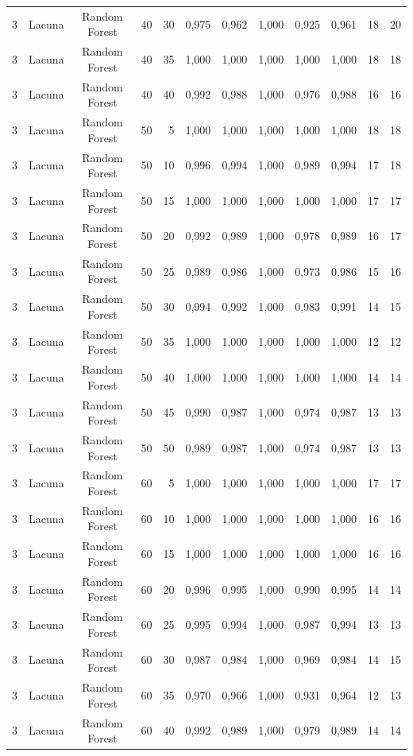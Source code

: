 \begin{longtable}{ccclrrrrrrrr}
3 & Lacuna & Random Forest & 40 & 30 & 0,975 & 0,962 & 1,000 & 0,925 & 0,961 & 18 & 20 \\
3 & Lacuna & Random Forest & 40 & 35 & 1,000 & 1,000 & 1,000 & 1,000 & 1,000 & 18 & 18 \\
3 & Lacuna & Random Forest & 40 & 40 & 0,992 & 0,988 & 1,000 & 0,976 & 0,988 & 16 & 16 \\
3 & Lacuna & Random Forest & 50 & 5 & 1,000 & 1,000 & 1,000 & 1,000 & 1,000 & 18 & 18 \\
3 & Lacuna & Random Forest & 50 & 10 & 0,996 & 0,994 & 1,000 & 0,989 & 0,994 & 17 & 18 \\
3 & Lacuna & Random Forest & 50 & 15 & 1,000 & 1,000 & 1,000 & 1,000 & 1,000 & 17 & 17 \\
3 & Lacuna & Random Forest & 50 & 20 & 0,992 & 0,989 & 1,000 & 0,978 & 0,989 & 16 & 17 \\
3 & Lacuna & Random Forest & 50 & 25 & 0,989 & 0,986 & 1,000 & 0,973 & 0,986 & 15 & 16 \\
3 & Lacuna & Random Forest & 50 & 30 & 0,994 & 0,992 & 1,000 & 0,983 & 0,991 & 14 & 15 \\
3 & Lacuna & Random Forest & 50 & 35 & 1,000 & 1,000 & 1,000 & 1,000 & 1,000 & 12 & 12 \\
3 & Lacuna & Random Forest & 50 & 40 & 1,000 & 1,000 & 1,000 & 1,000 & 1,000 & 14 & 14 \\
3 & Lacuna & Random Forest & 50 & 45 & 0,990 & 0,987 & 1,000 & 0,974 & 0,987 & 13 & 13 \\
3 & Lacuna & Random Forest & 50 & 50 & 0,989 & 0,987 & 1,000 & 0,974 & 0,987 & 13 & 13 \\
3 & Lacuna & Random Forest & 60 & 5 & 1,000 & 1,000 & 1,000 & 1,000 & 1,000 & 17 & 17 \\
3 & Lacuna & Random Forest & 60 & 10 & 1,000 & 1,000 & 1,000 & 1,000 & 1,000 & 16 & 16 \\
3 & Lacuna & Random Forest & 60 & 15 & 1,000 & 1,000 & 1,000 & 1,000 & 1,000 & 16 & 16 \\
3 & Lacuna & Random Forest & 60 & 20 & 0,996 & 0,995 & 1,000 & 0,990 & 0,995 & 14 & 14 \\
3 & Lacuna & Random Forest & 60 & 25 & 0,995 & 0,994 & 1,000 & 0,987 & 0,994 & 13 & 13 \\
3 & Lacuna & Random Forest & 60 & 30 & 0,987 & 0,984 & 1,000 & 0,969 & 0,984 & 14 & 15 \\
3 & Lacuna & Random Forest & 60 & 35 & 0,970 & 0,966 & 1,000 & 0,931 & 0,964 & 12 & 13 \\
3 & Lacuna & Random Forest & 60 & 40 & 0,992 & 0,989 & 1,000 & 0,979 & 0,989 & 14 & 14 \\

\end{longtable}
